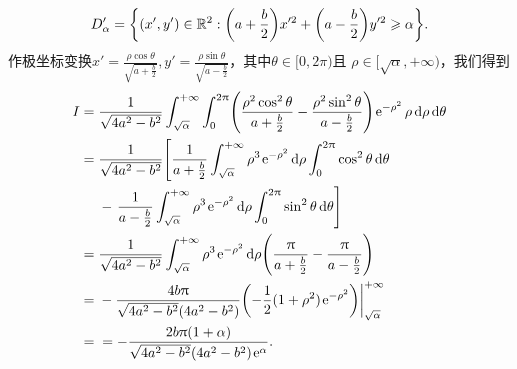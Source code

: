 \begin{solution}
\begin{inparaenum}[(a)]
    \[
      D_\alpha' = \left\{ (x',y')\in\MR^2:\left( a + \frac b2\right)x'^2 + \left( a - \frac b2 \right)y'^2 \ge \alpha \right\}.
    \]
    作极坐标变换$x'=\frac{\rho\cos\theta}{\sqrt{a+\frac b2}},y'=\frac{\rho\sin\theta}{\sqrt{a-\frac b2}}$，其中$\theta\in[0,2\pi)$且
    $\rho\in[\sqrt\alpha,+\infty)$，我们得到
    \begin{align*}
      I = {}& \frac1{\sqrt{4a^2-b^2}} \int_{\sqrt\alpha}^{+\infty} \int_0^{2\pi}
      \left( \frac{\rho^2\cos^2\theta}{a + \frac b2} - \frac{\rho^2\sin^2\theta}{a - \frac b2} \right) \ee^{-\rho^2} \rho \dif \rho \dif\theta \\
      = {}& \frac1{\sqrt{4a^2-b^2}}\left[ \frac1{a + \frac b2}\int_{\sqrt\alpha}^{+\infty}\rho^3
      \ee^{-\rho^2}\dif \rho \int_0^{2\pi}\cos^2\theta \dif\theta \right. \\
      & - \left. \frac1{a - \frac b2}\int_{\sqrt\alpha}^{+\infty}\rho^3
      \ee^{-\rho^2}\dif \rho \int_0^{2\pi}\sin^2\theta \dif\theta \right] \\
      = {}& \frac1{\sqrt{4a^2-b^2}} \int_{\sqrt\alpha}^{+\infty} \rho^3\ee^{-\rho^2} \dif \rho \left(  \frac\pi{a+\frac b2} - \frac\pi{a-\frac b2} \right) \\
      = {}& - \frac{4b\pi}{\sqrt{4a^2-b^2}(4a^2-b^2)}
      \left( -\frac12(1+\rho^2)\ee^{-\rho^2} \right)\bigg|_{\sqrt\alpha}^{+\infty} \\
      = {}& = -\frac{2b\pi(1+\alpha)}{
      \sqrt{4a^2-b^2}(4a^2-b^2)\ee^\alpha}.
    \end{align*}
  \end{inparaenum}
\end{solution}

\setcounter{solution}{20}

